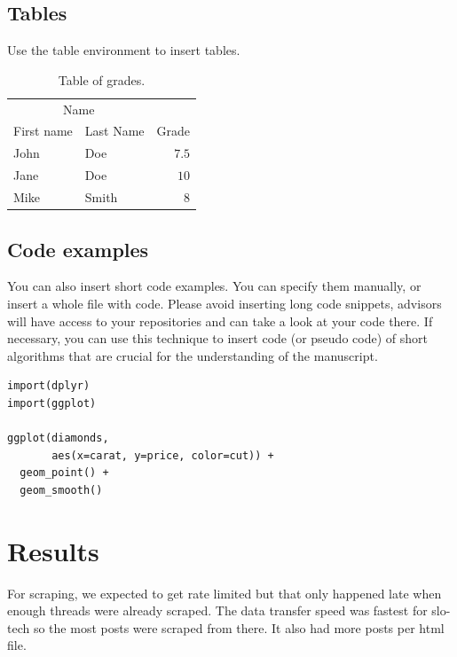 \documentclass[fleqn,moreauthors,10pt]{ds_report}
\begin{document}
\subsection*{Tables}

Use the table environment to insert tables.

\begin{table}[hbt]
	\caption{Table of grades.}
	\centering
	\begin{tabular}{l l | r}
		\toprule
		\multicolumn{2}{c}{Name} \\
		\cmidrule(r){1-2}
		First name & Last Name & Grade \\
		\midrule
		John & Doe & $7.5$ \\
		Jane & Doe & $10$ \\
		Mike & Smith & $8$ \\
		\bottomrule
	\end{tabular}
	\label{tab:label}
\end{table}


\subsection*{Code examples}

You can also insert short code examples. You can specify them manually, or insert a whole file with code. Please avoid inserting long code snippets, advisors will have access to your repositories and can take a look at your code there. If necessary, you can use this technique to insert code (or pseudo code) of short algorithms that are crucial for the understanding of the manuscript.

\lstset{language=Python}


\lstset{language=R}
\begin{lstlisting}
import(dplyr)
import(ggplot)

ggplot(diamonds,
	   aes(x=carat, y=price, color=cut)) +
  geom_point() +
  geom_smooth()
\end{lstlisting}

\fi
\section*{Results}
For scraping, we expected to get rate limited but that only happened late when enough threads were already scraped. The data transfer speed was fastest for slo-tech so the most posts were scraped from there. It also had more posts per html file.
\end{document}

